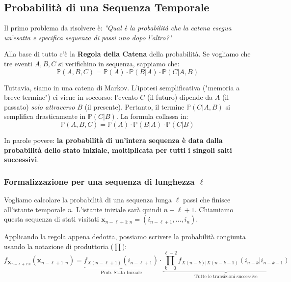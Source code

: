 \subsection{Probabilità di una Sequenza Temporale}

Il primo problema da risolvere è: \textit{"Qual è la probabilità che la catena esegua un'esatta e specifica sequenza di passi uno dopo l'altro?"}

Alla base di tutto c'è la \textbf{Regola della Catena} della probabilità. Se vogliamo che tre eventi $A, B, C$ si verifichino in sequenza, sappiamo che:
\begin{equation*}
    \mathbb{P}(A, B, C) = \mathbb{P}(A) \cdot \mathbb{P}(B|A) \cdot \mathbb{P}(C|A,B)
\end{equation*}

Tuttavia, siamo in una catena di Markov. L'ipotesi semplificativa ("memoria a breve termine") ci viene in soccorso: l'evento $C$ (il futuro) dipende da $A$ (il passato) \textit{solo attraverso} $B$ (il presente). Pertanto, il termine $\mathbb{P}(C|A,B)$ si semplifica drasticamente in $\mathbb{P}(C|B)$. La formula collassa in:
\begin{equation*}
    \mathbb{P}(A, B, C) = \mathbb{P}(A) \cdot \mathbb{P}(B|A) \cdot \mathbb{P}(C|B)
\end{equation*}

In parole povere: \textbf{la probabilità di un'intera sequenza è data dalla probabilità dello stato iniziale, moltiplicata per tutti i singoli salti successivi}.

\subsubsection*{Formalizzazione per una sequenza di lunghezza $\ell$}
Vogliamo calcolare la probabilità di una sequenza lunga $\ell$ passi che finisce all'istante temporale $n$. L'istante iniziale sarà quindi $n - \ell + 1$. 
Chiamiamo questa sequenza di stati visitati $\mathbf{x}_{n-\ell+1:n} = (i_{n-\ell+1}, \dots, i_n)$.

Applicando la regola appena dedotta, possiamo scrivere la probabilità congiunta usando la notazione di produttoria ($\prod$):
\begin{equation}
    f_{\mathbf{X}_{n-\ell+1:n}}(\mathbf{x}_{n-\ell+1:n}) = \underbrace{f_{X(n-\ell+1)}(i_{n-\ell+1})}_{\text{Prob. Stato Iniziale}} \cdot \underbrace{\prod_{k=0}^{\ell-2} f_{X(n-k)|X(n-k-1)}(i_{n-k} | i_{n-k-1})}_{\text{Tutte le transizioni successive}}
\end{equation}

